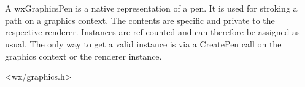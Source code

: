 
\section{}\label{wxgraphicspen}



A wxGraphicsPen is a native representation of a pen. It is used for stroking a path on a graphics context. The contents are specific and private to the respective renderer. Instances are ref counted and can therefore be assigned as usual. The only way to get a valid instance is via a CreatePen call on the graphics context or the renderer instance.


<wx/graphics.h>

